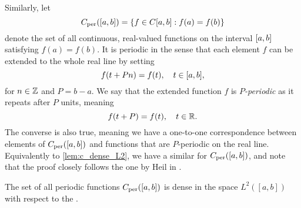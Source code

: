 \documentclass[../thesis.tex]{subfiles}
\begin{document}
Similarly, let 
\begin{equation}
    C_{\text{per}}([a,b])= \left\{f \in C[a,b]: f(a)=f(b)\right\}
\end{equation}
denote the set of all continuous, real-valued functions on the interval $[a,b]$ satisfying $f(a)=f(b)$. It is periodic in the sense that each element $f$ can be extended to the whole real line by setting 
\begin{equation}
    f(t+Pn) = f(t), \quad t\in [a,b],
\end{equation}
for $n\in \mathbb{Z}$ and $P=b-a$. We say that the extended function $f$ is $P$\emph{-periodic} as it repeats after $P$ units, meaning
\begin{equation}
    f(t+P) = f(t), \quad t\in \mathbb{R}.
\end{equation}
The converse is also true, meaning we have a one-to-one correspondence between elements of $C_{\text{per}}([a,b])$ and functions that are $P$-periodic on the real line. %
Equivalently to \cref{lem:c_dense_L2}, we have a similar  for $C_{\text{per}}([a,b])$, and note that the proof closely follows the one by Heil in \cite[p.~228]{heilMetricsNormsInner2018}.  %
\begin{lemma}\label{lem:c_per_dense_c_and_dense_L2}
    The set of all periodic functions $C_{\text{per}}([a,b])$ is dense in the space $L^2([a,b])$ with respect to the \Ltwonorm.
\end{lemma}
\end{document}

